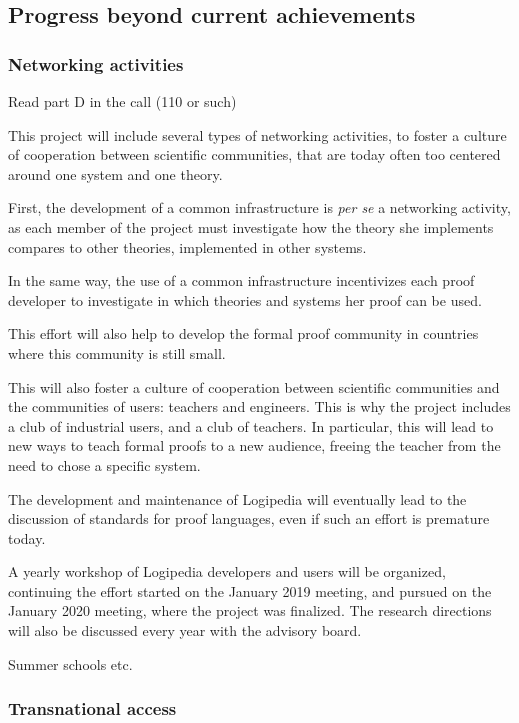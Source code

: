 \subsection{Progress beyond current achievements}

\subsubsection{Networking activities}

{\color{red} Read part D in the call (110 or such)}

This project will include several types of networking activities, to
foster a culture of cooperation between scientific communities, that
are today often too centered around one system and one theory.

First, the development of a common infrastructure is \emph{per se} a
networking activity, as each member of the project must investigate
how the theory she implements compares to other theories, implemented
in other systems.

In the same way, the use of a common infrastructure incentivizes each
proof developer to investigate in which theories and systems her proof
can be used.

This effort will also help to develop the formal proof community in
countries where this community is still small.

This will also foster a culture of cooperation between scientific
communities and the communities of users: teachers and engineers.
This is why the project includes a club of industrial users, and
a club of teachers. In particular, this will lead to new ways to teach
formal proofs to a new audience, freeing the teacher from the need to
chose a specific system.

The development and maintenance of {\sc Logipedia} will eventually lead
to the discussion of standards for proof languages, even if such an
effort is premature today.

A yearly workshop of {\sc Logipedia} developers and users will be
organized, continuing the effort started on the January 2019 meeting,
and pursued on the January 2020 meeting, where the project was
finalized. The research directions will also be discussed
every year with the advisory board.

{\color{red} Summer schools etc.}

\subsubsection{Transnational access}

